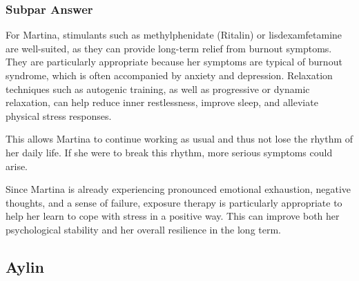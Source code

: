 \subsubsection{Subpar Answer}
For Martina, stimulants such as methyl\-phenidate (Ritalin) or lisdexamfetamine are well-suited, as they can provide long-term relief from burnout symptoms.
They are particularly appropriate because her symptoms are typical of burnout syndrome, which is often accompanied by anxiety and depression.
Relaxation techniques such as autogenic training, as well as progressive or dynamic relaxation, can help reduce inner restlessness, improve sleep, and alleviate physical stress responses.

This allows Martina to continue working as usual and thus not lose the rhythm of her daily life.
If she were to break this rhythm, more serious symptoms could arise.

Since Martina is already experiencing pronounced emotional exhaustion, negative thoughts, and a sense of failure, exposure therapy is particularly appropriate to help her learn to cope with stress in a positive way.
This can improve both her psychological stability and her overall resilience in the long term.

\subsection{Aylin \autocite[slide~15]{dbjr_stoerungsbilder}}
\label{app:AylinFull}
